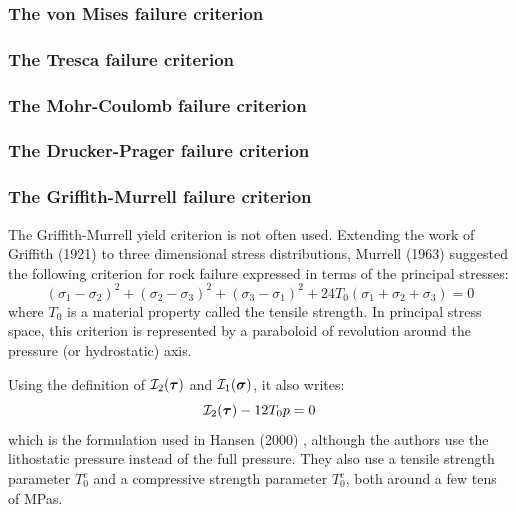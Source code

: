 \subsubsection{The von Mises failure criterion}\label{sec:vMcriterion}


\subsubsection{The Tresca failure criterion}


\subsubsection{The Mohr-Coulomb failure criterion}


\subsubsection{The Drucker-Prager failure criterion \label{sec:druckerprager}}


\subsubsection{The Griffith-Murrell failure criterion}

The Griffith-Murrell yield criterion \cite{brau94,brbe95,babr97} is not often used. 
Extending the work of Griffith (1921) to three dimensional stress distributions, 
Murrell (1963) suggested the following criterion for rock failure expressed 
in terms of the principal stresses:
\[
(\sigma_1-\sigma_2)^2 + (\sigma_2-\sigma_3)^2 + (\sigma_3-\sigma_1)^2
+
24T_0 (\sigma_1+\sigma_2+\sigma_3)=0
\]
where $T_0$ is a material property called the tensile strength. In principal stress space, 
this criterion is represented by a paraboloid of revolution around the pressure (or hydrostatic) axis.

Using the definition of ${\cal I}_2({\bm \tau})$ and ${\cal I}_1({\bm \sigma})$, it also writes:
\[
{\cal I}_2({\bm \tau}) - 12 T_0 p =0
\]
which is the formulation used in Hansen \etal (2000) \cite{hanl00}, although the authors
use the lithostatic pressure instead of the full pressure. They also use a tensile 
strength parameter $T_0^e$ and a compressive strength parameter $T_0^c$, both around a few tens 
of MPas.

